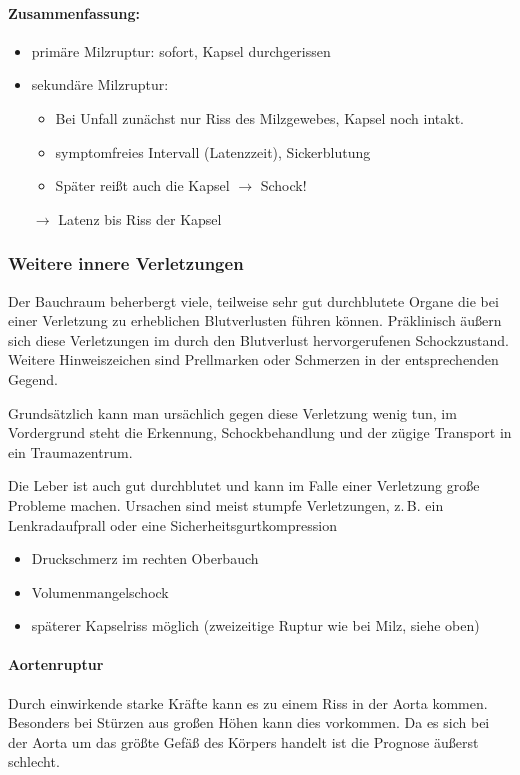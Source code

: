 \paragraph{Zusammenfassung:}
\begin{itemize}
  \item primäre Milzruptur: sofort, Kapsel durchgerissen
  \item sekundäre Milzruptur:
  \begin{itemize}
    \item Bei Unfall zunächst nur Riss des Milzgewebes, Kapsel noch intakt.
    \item symptomfreies Intervall (Latenzzeit), Sickerblutung
    \item Später reißt auch die Kapsel  ${\rightarrow}$ Schock!
  \end{itemize}
  ${\rightarrow}$ Latenz bis Riss der Kapsel
\end{itemize}




\subsubsection{Weitere innere Verletzungen}

Der Bauchraum beherbergt viele, teilweise sehr gut
durchblutete Organe die bei einer Verletzung zu erheblichen
Blutverlusten führen können. Präklinisch äußern sich diese
Verletzungen im durch den Blutverlust hervorgerufenen
Schockzustand. Weitere Hinweiszeichen sind Prellmarken oder
Schmerzen in der entsprechenden Gegend.

Grundsätzlich kann man ursächlich gegen diese Verletzung
wenig tun, im Vordergrund steht die Erkennung,
Schockbehandlung und der zügige Transport in ein
Traumazentrum.


{
Die Leber ist auch gut durchblutet und kann im Falle einer Verletzung große
Probleme machen. Ursachen sind meist stumpfe Verletzungen, z.\,B. ein
Lenkradaufprall oder eine Sicherheitsgurtkompression
}{
\begin{itemize}
  \item Druckschmerz im rechten Oberbauch
  \item Volumenmangelschock
  \item späterer Kapselriss möglich (zweizeitige Ruptur wie bei Milz, siehe oben)
\end{itemize}
}

\paragraph{Aortenruptur}\label{topic:aortenruptur}Durch
einwirkende starke Kräfte kann es zu einem Riss in der Aorta
kommen. Besonders bei Stürzen aus großen Höhen kann dies
vorkommen. Da es sich bei der Aorta um das größte Gefäß des
Körpers handelt ist die Prognose äußerst schlecht.

